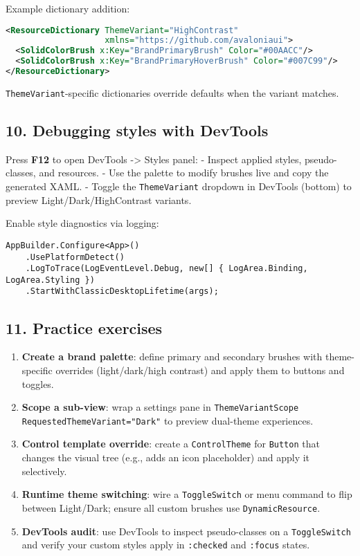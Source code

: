 Example dictionary addition:

\begin{lstlisting}[language=XML]
<ResourceDictionary ThemeVariant="HighContrast"
                    xmlns="https://github.com/avaloniaui">
  <SolidColorBrush x:Key="BrandPrimaryBrush" Color="#00AACC"/>
  <SolidColorBrush x:Key="BrandPrimaryHoverBrush" Color="#007C99"/>
</ResourceDictionary>
\end{lstlisting}

\passthrough{\lstinline!ThemeVariant!}-specific dictionaries override
defaults when the variant matches.

\subsection{10. Debugging styles with
DevTools}\label{debugging-styles-with-devtools}

Press \textbf{F12} to open DevTools -\textgreater{} Styles panel: -
Inspect applied styles, pseudo-classes, and resources. - Use the palette
to modify brushes live and copy the generated XAML. - Toggle the
\passthrough{\lstinline!ThemeVariant!} dropdown in DevTools (bottom) to
preview Light/Dark/HighContrast variants.

Enable style diagnostics via logging:

\begin{lstlisting}
AppBuilder.Configure<App>()
    .UsePlatformDetect()
    .LogToTrace(LogEventLevel.Debug, new[] { LogArea.Binding, LogArea.Styling })
    .StartWithClassicDesktopLifetime(args);
\end{lstlisting}

\subsection{11. Practice exercises}\label{practice-exercises-1}

\begin{enumerate}
\def\labelenumi{\arabic{enumi}.}
\tightlist
\item
  \textbf{Create a brand palette}: define primary and secondary brushes
  with theme-specific overrides (light/dark/high contrast) and apply
  them to buttons and toggles.
\item
  \textbf{Scope a sub-view}: wrap a settings pane in
  \passthrough{\lstinline!ThemeVariantScope RequestedThemeVariant="Dark"!}
  to preview dual-theme experiences.
\item
  \textbf{Control template override}: create a
  \passthrough{\lstinline!ControlTheme!} for
  \passthrough{\lstinline!Button!} that changes the visual tree (e.g.,
  adds an icon placeholder) and apply it selectively.
\item
  \textbf{Runtime theme switching}: wire a
  \passthrough{\lstinline!ToggleSwitch!} or menu command to flip between
  Light/Dark; ensure all custom brushes use
  \passthrough{\lstinline!DynamicResource!}.
\item
  \textbf{DevTools audit}: use DevTools to inspect pseudo-classes on a
  \passthrough{\lstinline!ToggleSwitch!} and verify your custom styles
  apply in \passthrough{\lstinline!:checked!} and
  \passthrough{\lstinline!:focus!} states.
\end{enumerate}

